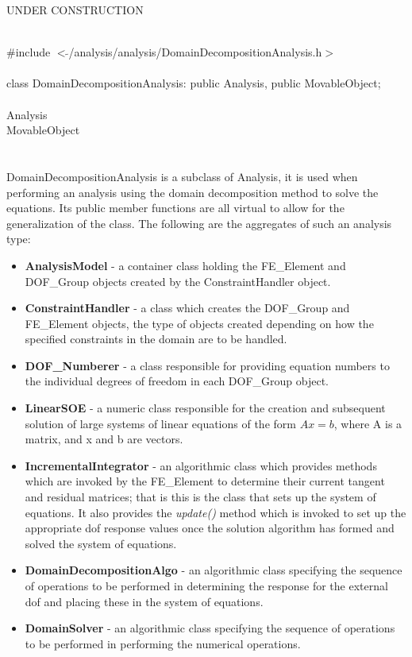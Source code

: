 
UNDER CONSTRUCTION

   \\
\indent \#include $<\tilde{
}$/analysis/analysis/DomainDecompositionAnalysis.h$>$  \\ 

  \\
\indent class DomainDecompositionAnalysis: public Analysis, public MovableObject;  \\

 \\
\indent Analysis \\
\indent MovableObject \\
\indent{} \\

 \\ 
\indent DomainDecompositionAnalysis is a subclass of Analysis, 
it is used when performing an analysis using the domain decomposition
method to solve the equations. Its public member functions are all
virtual to allow for the generalization of the 
class. The following are the aggregates of such an analysis type:
\begin{itemize}
\item {\bf AnalysisModel} - a container class holding the FE\_Element
and DOF\_Group objects created by the ConstraintHandler object. 
\item {\bf ConstraintHandler} - a class which creates the DOF\_Group
and FE\_Element objects, the type of objects created depending on how
the specified constraints in the domain are to be handled. 
\item {\bf DOF\_Numberer} - a class responsible for providing equation
numbers to the individual degrees of freedom in each DOF\_Group object.
\item {\bf LinearSOE} - a numeric class responsible for the creation
and subsequent solution of large systems of linear equations of the
form $Ax = b$, where A is a matrix, and x and b are vectors.
\item {\bf IncrementalIntegrator} - an algorithmic class which provides
methods which are invoked by the FE\_Element to determine their
current tangent and residual matrices; that is this is the class that
sets up the system of equations.  It also provides the {\em
update()} method which is invoked to set up the appropriate dof
response values once the solution algorithm has formed and solved the
system of equations.
\item {\bf DomainDecompositionAlgo} - an algorithmic class specifying the
sequence of operations to be performed in determining the response
for the external dof and placing these in the system of equations.
\item {\bf DomainSolver} - an algorithmic class specifying the
sequence of operations to be performed in performing the numerical 
operations.
\end{itemize}


